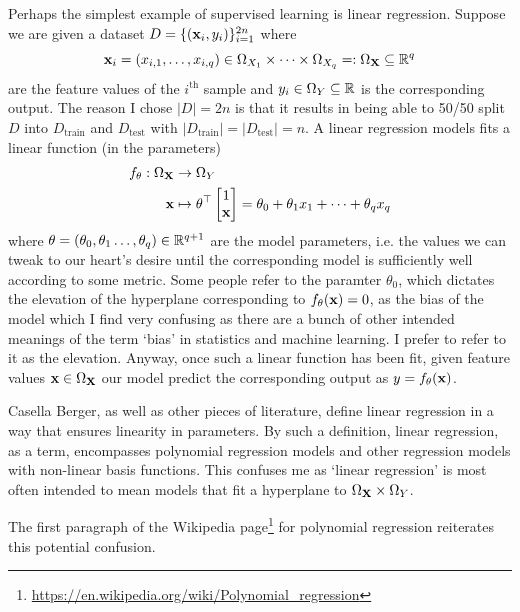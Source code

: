 \documentclass[11pt]{article}
\begin{document}
Perhaps the simplest example of supervised learning is linear regression. Suppose we are given a dataset $D=\{(\mathbf{x}_i,y_i)\}_{i=1}^{2n}$ where
$$
\mathbf{x}_i=(x_{i,1},\dots,x_{i, q})\in \Omega_{X_1}\times\dots\times \Omega_{X_q}=:\Omega_{\mathbf{X}}\subseteq\mathbb{R}^q
$$
are the feature values of the $i^{\text{th}}$ sample and $y_i\in \Omega_{Y}\subseteq\mathbb{R}$ is the corresponding output. The reason I chose $|D|=2n$ is that it results in being able to 50/50 split $D$ into $D_{\text{train}}$ and $D_{\text{test}}$ with $|D_{\text{train}}|=|D_{\text{test}}|=n$. A linear regression models fits a linear function (in the parameters)
\begin{align*}
    f_{\theta}:\Omega_{\mathbf{X}}&\rightarrow \Omega_Y\\
    \mathbf{x}&\mapsto
    \theta^{\top}
    \begin{bmatrix}
        1\\
        \mathbf{x}
    \end{bmatrix}
    =
    \theta_0+\theta_1x_1+\dots+\theta_qx_q    
\end{align*}
where $\theta=(\theta_0,\theta_1\dots,\theta_q)\in\mathbb{R}^{q+1}$ are the model parameters, i.e. the values we can tweak to our heart's desire until the corresponding model is sufficiently well according to some metric. Some people refer to the paramter $\theta_0$, which dictates the elevation of the hyperplane corresponding to $f_{\theta}(\mathbf{x})=0$, as the bias of the model which I find very confusing as there are a bunch of other intended meanings of the term `bias' in statistics and machine learning. I prefer to refer to it as the elevation. Anyway, once such a linear function has been fit, given feature values $\mathbf{x}\in\Omega_{\mathbf{X}}$ our model predict the corresponding output as $y=f_{\theta}(\mathbf{x})$.

\begin{tcolorbox}[title={\centering\textbf{What does the `linear' in linear regression acrually refer to?}}, colback=myLightBlue, colbacktitle=myDarkBlue, colframe=myDarkBlue, coltitle=white]
    Casella Berger, as well as other pieces of literature, define linear regression in a way that ensures linearity in parameters. By such a definition, linear regression, as a term, encompasses polynomial regression models and other regression models with non-linear basis functions. This confuses me as `linear regression' is most often intended to mean models that fit a hyperplane to $\Omega_{\mathbf{X}}\times\Omega_Y$.
    
    \hspace{14.52pt} The first paragraph of the Wikipedia page\footnote{\url{https://en.wikipedia.org/wiki/Polynomial_regression}} for polynomial regression reiterates this potential confusion.
\end{tcolorbox}
\end{document}
